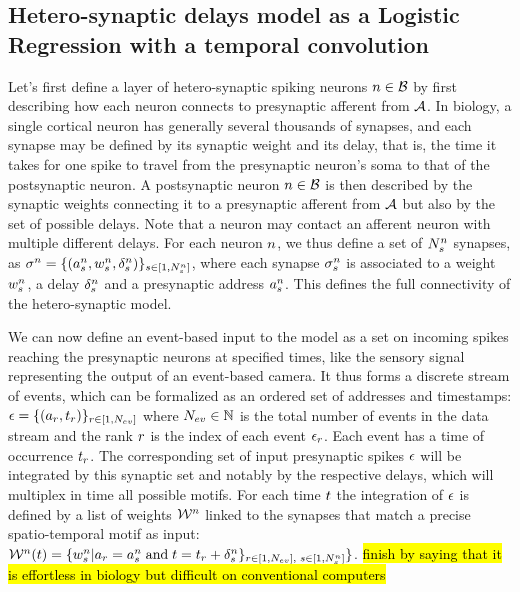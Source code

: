 \documentclass[default]{sn-jnl}%
\theoremstyle{thmstyleone}%
\theoremstyle{thmstyletwo}%
\theoremstyle{thmstylethree}%
\DeclareRobustCommand{\note}[1]{{\sethlcolor{yellow}\hl{#1}}}
\begin{document}
\subsection{Hetero-synaptic delays model as a Logistic Regression with a temporal convolution}
Let's first define a layer of hetero-synaptic spiking neurons $n \in \mathcal{B}$ by first describing how each neuron connects to presynaptic afferent from $\mathcal{A}$. In biology, a single cortical neuron has generally several thousands of synapses, and each synapse may be defined by its synaptic weight and its delay, that is, the time it takes for one spike to travel from the presynaptic neuron's soma to that of the postsynaptic neuron. A postsynaptic neuron $n \in \mathcal{B}$ is then described by the synaptic weights connecting it to a presynaptic afferent from $\mathcal{A}$ but also by the set of possible delays. Note that a neuron may contact an afferent neuron with multiple different delays. For each neuron $n$, we thus define a set of $N_{s}^n$ synapses, as  $\sigma^n = \{(a^n_s, w^n_s, \delta^n_s)\}_{s \in [1,N_{s}^n]}$, where each synapse $\sigma^n_s$ is associated to a weight $w^n_s$, a delay $\delta^n_s$ and a presynaptic address $a^n_s$. This defines the full connectivity of the hetero-synaptic model.

We can now define an event-based input to the model as a set on incoming spikes reaching the presynaptic neurons at specified times, like the sensory signal representing the output of an event-based camera. It thus forms a discrete stream of events, which can be formalized as an ordered set of addresses and timestamps: $\epsilon = \{(a_r, t_r)\}_{r \in [1,N_{ev}]}$ where $N_{ev} \in \mathbb{N} $ is the total number of events in the data stream and the rank $r$ is the index of each event $\epsilon_r$. Each event has a time of occurrence $t_r$. The corresponding set of input presynaptic spikes $\epsilon$ will be integrated by this synaptic set and notably by the respective delays, which will multiplex in time all possible motifs. For each time $t$ the integration of $\epsilon$ is defined by a list of weights $\mathcal{W}^n$ linked to the synapses that match a precise spatio-temporal motif as input:
$
\mathcal{W}^n (t) = 
\{ w_s^n  \vert 
a_r = 
 a_s^n \; \text{and} \; t=t_r + 
\delta_s^n \}_{ r \in [1,N_{ev}]\text{, }s \in [1,N_{s}^n]} 
\}
$.
\note{finish by saying that it is effortless in biology but difficult on conventional computers}
\end{document}

